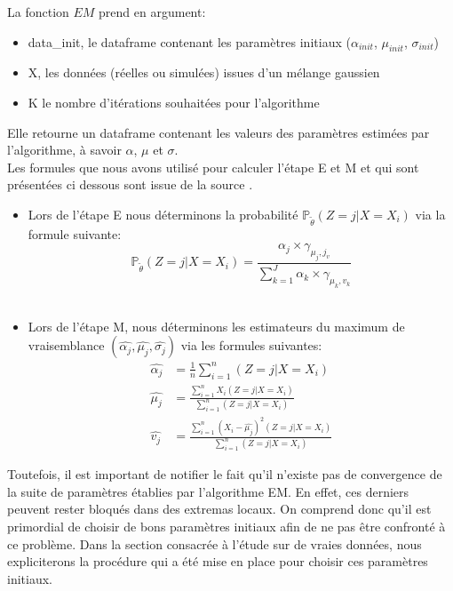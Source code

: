 \documentclass[a4paper,french,10pt]{article}
\begin{document}
La fonction $EM$ prend en argument:
\begin{itemize}
	\item data\_init, le dataframe contenant les paramètres initiaux ($\alpha_{init}$, $\mu_{init}$, $\sigma_{init}$)
	\item X, les données (réelles ou simulées) issues d'un mélange gaussien
	\item K le nombre d'itérations souhaitées pour l'algorithme
\end{itemize}  
Elle retourne un dataframe contenant les valeurs des
paramètres estimées par l'algorithme, à savoir $\alpha$, $\mu$ et $\sigma$. \\
Les formules que nous avons utilisé pour calculer l'étape E et M et qui sont présentées ci dessous sont issue de la source \cite{EM_algorithm}.
\begin{itemize}
	\item Lors de l'étape E nous déterminons la probabilité $\mathbb{P}_{\tilde{\theta}}(Z = j| X = X_i)$ via la formule suivante:
	\[
	\mathbb{P}_{\tilde{\theta}}(Z = j| X = X_i) = \frac{\alpha_j \times \gamma_{\mu_j, j_v}}{\sum_{k=1}^{J} \alpha_k \times \gamma_{\mu_k, v_k}}
	\] \\
	\item Lors de l'étape M, nous déterminons les estimateurs du maximum de vraisemblance $(\widehat{\alpha_j}, \widehat{\mu_j}, \widehat{\sigma_j})$ via les formules suivantes:
	\begin{align*}
		\widehat{\alpha_j} &= \displaystyle\frac{1}{n}\sum_{i=1}^n (Z=j|X=X_i) \\
		\widehat{\mu_j} &= \displaystyle\frac{\displaystyle\sum_{i=1}^n X_i (Z=j|X=X_i)}{\displaystyle\sum_{i=1}^n (Z=j|X=X_i)} \\
		\widehat{v_j} &= \displaystyle\frac{\displaystyle\sum_{i=1}^n (X_i -\widehat{\mu_j})^2 (Z=j|X=X_i)}{\displaystyle\sum_{i=1}^n (Z=j|X=X_i)}
	\end{align*} 
\end{itemize}
\vspace{7mm}
Toutefois, il est important de notifier le fait qu'il n'existe pas de convergence de la suite de paramètres établies par l'algorithme EM. En effet, ces derniers peuvent rester bloqués dans des extremas locaux. On comprend donc qu'il est primordial de choisir de bons paramètres initiaux afin de ne pas être confronté à ce problème. Dans la section consacrée à l'étude sur de vraies données, nous expliciterons la procédure qui a été mise en place pour choisir ces paramètres initiaux.
\end{document}

